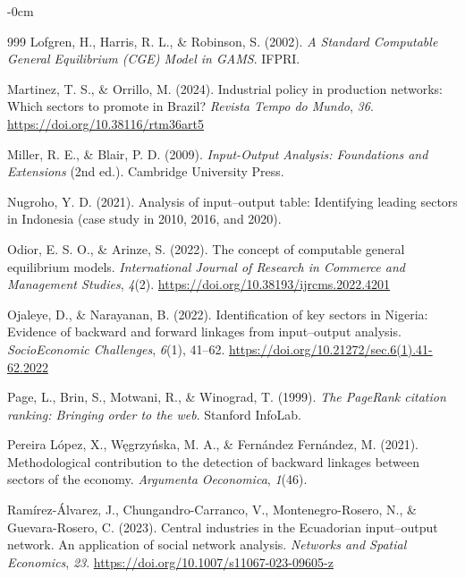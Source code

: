 \documentclass[journal,article,submit,pdftex,moreauthors]{Definitions/mdpi}
\begin{document}
\begin{adjustwidth}{-\extralength}{0cm}
{\begin{thebibliography}{999}
Lofgren, H., Harris, R. L., \& Robinson, S. (2002). \textit{A Standard Computable General Equilibrium (CGE) Model in GAMS}. IFPRI.

Martinez, T. S., \& Orrillo, M. (2024). Industrial policy in production networks: Which sectors to promote in Brazil? \textit{Revista Tempo do Mundo}, \textit{36}. \url{https://doi.org/10.38116/rtm36art5}

Miller, R. E., \& Blair, P. D. (2009). \textit{Input-Output Analysis: Foundations and Extensions} (2nd ed.). Cambridge University Press.

Nugroho, Y. D. (2021). Analysis of input--output table: Identifying leading sectors in Indonesia (case study in 2010, 2016, and 2020).

Odior, E. S. O., \& Arinze, S. (2022). The concept of computable general equilibrium models. \textit{International Journal of Research in Commerce and Management Studies}, \textit{4}(2). \url{https://doi.org/10.38193/ijrcms.2022.4201}

Ojaleye, D., \& Narayanan, B. (2022). Identification of key sectors in Nigeria: Evidence of backward and forward linkages from input--output analysis. \textit{SocioEconomic Challenges}, \textit{6}(1), 41--62. \url{https://doi.org/10.21272/sec.6(1).41-62.2022}

Page, L., Brin, S., Motwani, R., \& Winograd, T. (1999). \textit{The PageRank citation ranking: Bringing order to the web}. Stanford InfoLab.

Pereira López, X., Węgrzyńska, M. A., \& Fernández Fernández, M. (2021). Methodological contribution to the detection of backward linkages between sectors of the economy. \textit{Argumenta Oeconomica}, \textit{1}(46).

Ramírez-Álvarez, J., Chungandro-Carranco, V., Montenegro-Rosero, N., \& Guevara-Rosero, C. (2023). Central industries in the Ecuadorian input--output network. An application of social network analysis. \textit{Networks and Spatial Economics}, \textit{23}. \url{https://doi.org/10.1007/s11067-023-09605-z}


\end{thebibliography}}
\end{adjustwidth}
\end{document}
